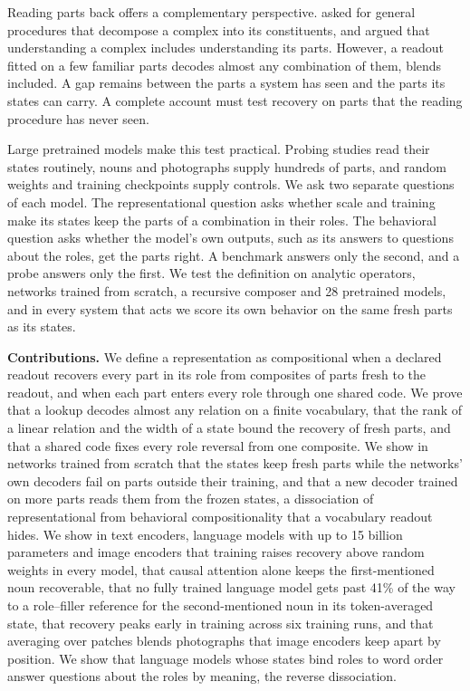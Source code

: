 \documentclass[10pt]{article}
\theoremstyle{plain}
\theoremstyle{remark}
\begin{document}
Reading parts back offers a complementary perspective. \citet{vangelder1990} asked for general procedures that decompose a complex into its constituents, and \citet{fodor2002} argued that understanding a complex includes understanding its parts. However, a readout fitted on a few familiar parts decodes almost any combination of them, blends included. A gap remains between the parts a system has seen and the parts its states can carry. A complete account must test recovery on parts that the reading procedure has never seen.

Large pretrained models make this test practical. Probing studies read their states routinely, nouns and photographs supply hundreds of parts, and random weights and training checkpoints supply controls. We ask two separate questions of each model. The representational question asks whether scale and training make its states keep the parts of a combination in their roles. The behavioral question asks whether the model's own outputs, such as its answers to questions about the roles, get the parts right. A benchmark answers only the second, and a probe answers only the first. We test the definition on analytic operators, networks trained from scratch, a recursive composer and 28 pretrained models, and in every system that acts we score its own behavior on the same fresh parts as its states.

\textbf{Contributions.} We define a representation as compositional when a declared readout recovers every part in its role from composites of parts fresh to the readout, and when each part enters every role through one shared code. We prove that a lookup decodes almost any relation on a finite vocabulary, that the rank of a linear relation and the width of a state bound the recovery of fresh parts, and that a shared code fixes every role reversal from one composite. We show in networks trained from scratch that the states keep fresh parts while the networks' own decoders fail on parts outside their training, and that a new decoder trained on more parts reads them from the frozen states, a dissociation of representational from behavioral compositionality that a vocabulary readout hides. We show in text encoders, language models with up to 15 billion parameters and image encoders that training raises recovery above random weights in every model, that causal attention alone keeps the first-mentioned noun recoverable, that no fully trained language model gets past 41\% of the way to a role--filler reference for the second-mentioned noun in its token-averaged state, that recovery peaks early in training across six training runs, and that averaging over patches blends photographs that image encoders keep apart by position. We show that language models whose states bind roles to word order answer questions about the roles by meaning, the reverse dissociation.
\end{document}
